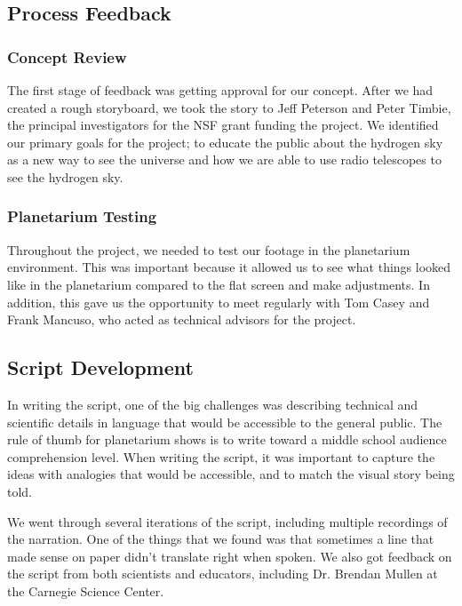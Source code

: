 \subsection{Process Feedback}

\subsubsection{Concept Review}

The first stage of feedback was getting approval for our concept. After we had created a rough storyboard, we took the story to Jeff Peterson and Peter Timbie, the principal investigators for the NSF grant funding the project. We identified our primary goals for the project; to educate the public about the hydrogen sky as a new way to see the universe and how we are able to use radio telescopes to see the hydrogen sky. 

\subsubsection{Planetarium Testing}

Throughout the project, we needed to test our footage in the planetarium environment. This was important because it allowed us to see what things looked like in the planetarium compared to the flat screen and make adjustments. In addition, this gave us the opportunity to meet regularly with Tom Casey and Frank Mancuso, who acted as technical advisors for the project. 


\subsection{Script Development}

In writing the script, one of the big challenges was describing technical and scientific details in language that would be accessible to the general public. The rule of thumb for planetarium shows is to write toward a middle school audience comprehension level. When writing the script, it was important to capture the ideas with analogies that would be accessible, and to match the visual story being told. 

We went through several iterations of the script, including multiple recordings of the narration. One of the things that we found was that sometimes a line that made sense on paper didn't translate right when spoken. We also got feedback on the script from both scientists and educators, including Dr. Brendan Mullen at the Carnegie Science Center. 

